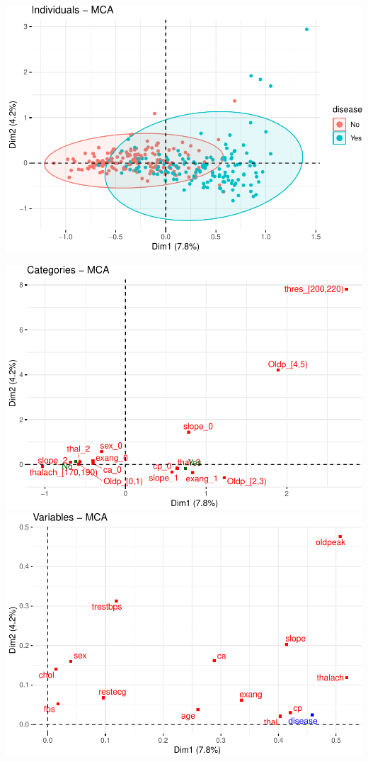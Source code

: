 \documentclass[]{article}
\begin{document}
\includegraphics{project_report_files/figure-latex/unnamed-chunk-20-1.pdf}

\includegraphics{project_report_files/figure-latex/unnamed-chunk-21-1.pdf}
\includegraphics{project_report_files/figure-latex/unnamed-chunk-21-2.pdf}
\end{document}
